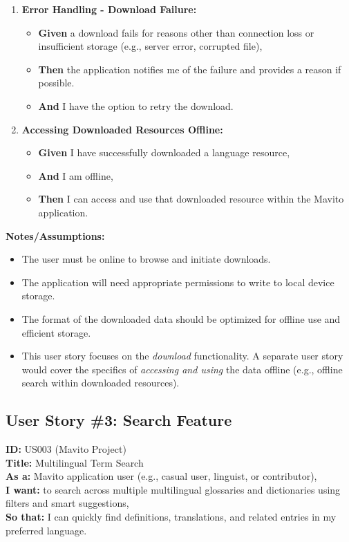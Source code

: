 \documentclass[12pt]{article}
\begin{document}
\begin{enumerate}
    \item \textbf{Error Handling - Download Failure:}
    \begin{itemize}
        \item \textbf{Given} a download fails for reasons other than connection loss or insufficient storage (e.g., server error, corrupted file),
        \item \textbf{Then} the application notifies me of the failure and provides a reason if possible.
        \item \textbf{And} I have the option to retry the download.
    \end{itemize}

    \item \textbf{Accessing Downloaded Resources Offline:}
    \begin{itemize}
        \item \textbf{Given} I have successfully downloaded a language resource,
        \item \textbf{And} I am offline,
        \item \textbf{Then} I can access and use that downloaded resource within the Mavito application.
    \end{itemize}
\end{enumerate}

\vspace{1em}
\textbf{Notes/Assumptions:}
\begin{itemize}
    \item The user must be online to browse and initiate downloads.
    \item The application will need appropriate permissions to write to local device storage.
    \item The format of the downloaded data should be optimized for offline use and efficient storage.
    \item This user story focuses on the \textit{download} functionality. A separate user story would cover the specifics of \textit{accessing and using} the data offline (e.g., offline search within downloaded resources).
\end{itemize}


\subsection{User Story \#3: Search Feature}

\textbf{ID:} US003 (Mavito Project) \\
\textbf{Title:} Multilingual Term Search \\
\textbf{As a:} Mavito application user (e.g., casual user, linguist, or contributor), \\
\textbf{I want:} to search across multiple multilingual glossaries and dictionaries using filters and smart suggestions, \\
\textbf{So that:} I can quickly find definitions, translations, and related entries in my preferred language.
\end{document}
